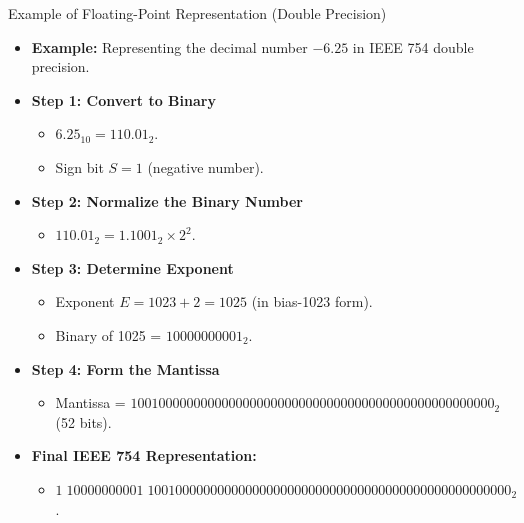 \documentclass[aspectratio=169]{beamer}
\begin{document}
\begin{frame}{Example of Floating-Point Representation (Double Precision)}
    \begin{itemize}
        \item \textbf{Example:} Representing the decimal number \( -6.25 \) in IEEE 754 double precision.
        \item \textbf{Step 1: Convert to Binary}
        \begin{itemize}
            \item \( 6.25_{10} = 110.01_2 \).
            \item Sign bit \( S = 1 \) (negative number).
        \end{itemize}
        \item \textbf{Step 2: Normalize the Binary Number}
        \begin{itemize}
            \item \( 110.01_2 = 1.1001_2 \times 2^2 \).
        \end{itemize}
        \item \textbf{Step 3: Determine Exponent}
        \begin{itemize}
            \item Exponent \( E = 1023 + 2 = 1025 \) (in bias-1023 form).
            \item Binary of 1025 = \( 10000000001_2 \).
        \end{itemize}
        \item \textbf{Step 4: Form the Mantissa}
        \begin{itemize}
            \item Mantissa = \( 1001000000000000000000000000000000000000000000000000_2 \) (52 bits).
        \end{itemize}
        \item \textbf{Final IEEE 754 Representation:}
        \begin{itemize}
            \item \( 1\;10000000001\;1001000000000000000000000000000000000000000000000000_2 \).
        \end{itemize}
    \end{itemize}
\end{frame}
\end{document}
